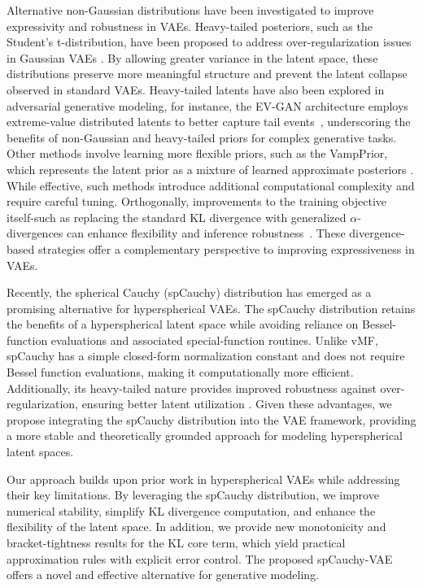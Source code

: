 \documentclass{article}
\begin{document}
Alternative non-Gaussian distributions have been investigated to improve expressivity and robustness in VAEs. Heavy-tailed posteriors, such as the Student’s t-distribution, have been proposed to address over-regularization issues in Gaussian VAEs \citep{kim2024t3vae}. By allowing greater variance in the latent space, these distributions preserve more meaningful structure and prevent the latent collapse observed in standard VAEs. Heavy-tailed latents have also been explored in adversarial generative modeling, for instance, the EV-GAN architecture employs extreme-value distributed latents to better capture tail events~\citep{allouche2023evgan}, underscoring the benefits of non-Gaussian and heavy-tailed priors for complex generative tasks. Other methods involve learning more flexible priors, such as the VampPrior, which represents the latent prior as a mixture of learned approximate posteriors \citep{tomczak2018vampprior}. While effective, such methods introduce additional computational complexity and require careful tuning. Orthogonally, improvements to the training objective itself-such as replacing the standard KL divergence with generalized $\alpha$-divergences can enhance flexibility and inference robustness~\citep{daudel2023alpha}. These divergence-based strategies offer a complementary perspective to improving expressiveness in VAEs.


Recently, the spherical Cauchy (spCauchy) distribution \citep{spCauchy} has emerged as a promising alternative for hyperspherical VAEs. The spCauchy distribution retains the benefits of a hyperspherical latent space while avoiding reliance on Bessel-function evaluations and associated special-function routines. Unlike vMF, spCauchy has a simple closed-form normalization constant and does not require Bessel function evaluations, making it computationally more efficient. Additionally, its heavy-tailed nature provides improved robustness against over-regularization, ensuring better latent utilization \citep{spCauchy}. Given these advantages, we propose integrating the spCauchy distribution into the VAE framework, providing a more stable and theoretically grounded approach for modeling hyperspherical latent spaces.

Our approach builds upon prior work in hyperspherical VAEs while addressing their key limitations. By leveraging the spCauchy distribution, we improve numerical stability, simplify KL divergence computation, and enhance the flexibility of the latent space. In addition, we provide new monotonicity and bracket-tightness results for the KL core term, which yield practical approximation rules with explicit error control. The proposed spCauchy-VAE offers a novel and effective alternative for generative modeling.
\end{document}
